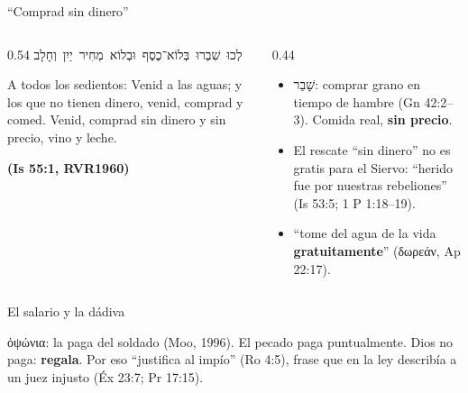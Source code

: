\documentclass[hyperref={bookmarks=false},aspectratio=169]{beamer}
\newcommand{\heb}[1]{\mbox{\foreignlanguage{hebrew}{#1}}}
\newcommand{\grc}[1]{\foreignlanguage{ancientgreek}{#1}}
\newcommand{\fuente}[1]{\par\hfill{\upshape\bfseries\footnotesize\textcolor{azul}{#1}}}
\newcommand{\destacar}[1]{\textbf{\textcolor{azul}{#1}}}
\begin{document}
\begin{frame}{``Comprad sin dinero''}
\begin{columns}[c,onlytextwidth]
\begin{column}{0.54\textwidth}
\centering\heb{לְכוּ שִׁבְרוּ בְּלוֹא־כֶסֶף וּבְלוֹא מְחִיר יַיִן וְחָלָב}
\begin{cita}A todos los sedientos: Venid a las aguas; y los que no tienen dinero, venid, comprad y comed. Venid, comprad sin dinero y sin precio, vino y leche.\fuente{(Is 55:1, RVR1960)}\end{cita}
\end{column}
\begin{column}{0.44\textwidth}\small\RaggedRight
\begin{itemize}
\item \heb{שָׁבַר}: comprar grano en tiempo de hambre (Gn 42:2--3). Comida real, \destacar{sin precio}.
\item El rescate ``sin dinero'' no es gratis para el Siervo: ``herido fue por nuestras rebeliones'' (Is 53:5; 1 P 1:18--19).
\item ``tome del agua de la vida \destacar{gratuitamente}'' (\grc{δωρεάν}, Ap 22:17).
\end{itemize}
\end{column}
\end{columns}
\end{frame}

\begin{frame}{El salario y la dádiva}
\centering
{}\par\medskip
\small\RaggedRight \grc{ὀψώνια}: la paga del soldado (Moo, 1996). El pecado paga puntualmente. Dios no paga: \destacar{regala}. Por eso ``justifica al impío'' (Ro 4:5), frase que en la ley describía a un juez injusto (Éx 23:7; Pr 17:15).
\end{frame}
\end{document}
